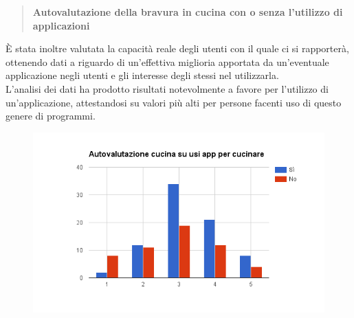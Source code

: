 \begin{quote}
	\textbf{Autovalutazione della bravura in cucina con o senza l'utilizzo
	di applicazioni}
\end{quote}
È stata inoltre valutata la capacità reale degli utenti con il quale ci si
rapporterà, ottenendo dati a riguardo di un'effettiva miglioria apportata da
un'eventuale applicazione negli utenti e gli interesse degli stessi nel
utilizzarla.\\
L'analisi dei dati ha prodotto risultati notevolmente a favore per l'utilizzo di
un'applicazione, attestandosi su valori più alti per persone facenti uso di
questo genere di programmi.
\begin{figure}[H]
	\includegraphics[width=\textwidth]{img/chart_autovalutazione_e_usi_app}
\end{figure}

